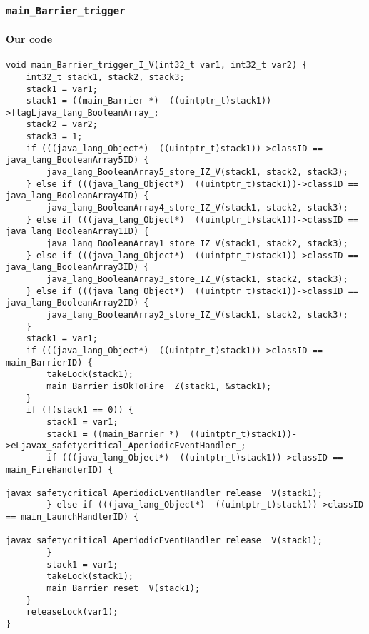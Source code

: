 \subsubsection{\texttt{main\_Barrier\_trigger}}

\paragraph{Our code}\hfill
\begin{lstlisting}[firstnumber=1803]
void main_Barrier_trigger_I_V(int32_t var1, int32_t var2) {
	int32_t stack1, stack2, stack3;
	stack1 = var1;
	stack1 = ((main_Barrier *)  ((uintptr_t)stack1))->flagLjava_lang_BooleanArray_;
	stack2 = var2;
	stack3 = 1;
	if (((java_lang_Object*)  ((uintptr_t)stack1))->classID == java_lang_BooleanArray5ID) {
		java_lang_BooleanArray5_store_IZ_V(stack1, stack2, stack3);
	} else if (((java_lang_Object*)  ((uintptr_t)stack1))->classID == java_lang_BooleanArray4ID) {
		java_lang_BooleanArray4_store_IZ_V(stack1, stack2, stack3);
	} else if (((java_lang_Object*)  ((uintptr_t)stack1))->classID == java_lang_BooleanArray1ID) {
		java_lang_BooleanArray1_store_IZ_V(stack1, stack2, stack3);
	} else if (((java_lang_Object*)  ((uintptr_t)stack1))->classID == java_lang_BooleanArray3ID) {
		java_lang_BooleanArray3_store_IZ_V(stack1, stack2, stack3);
	} else if (((java_lang_Object*)  ((uintptr_t)stack1))->classID == java_lang_BooleanArray2ID) {
		java_lang_BooleanArray2_store_IZ_V(stack1, stack2, stack3);
	}
	stack1 = var1;
	if (((java_lang_Object*)  ((uintptr_t)stack1))->classID == main_BarrierID) {
		takeLock(stack1);
		main_Barrier_isOkToFire__Z(stack1, &stack1);
	}
	if (!(stack1 == 0)) {
		stack1 = var1;
		stack1 = ((main_Barrier *)  ((uintptr_t)stack1))->eLjavax_safetycritical_AperiodicEventHandler_;
		if (((java_lang_Object*)  ((uintptr_t)stack1))->classID == main_FireHandlerID) {
			javax_safetycritical_AperiodicEventHandler_release__V(stack1);
		} else if (((java_lang_Object*)  ((uintptr_t)stack1))->classID == main_LaunchHandlerID) {
			javax_safetycritical_AperiodicEventHandler_release__V(stack1);
		}
		stack1 = var1;
		takeLock(stack1);
		main_Barrier_reset__V(stack1);
	}
	releaseLock(var1);
}
\end{lstlisting}

